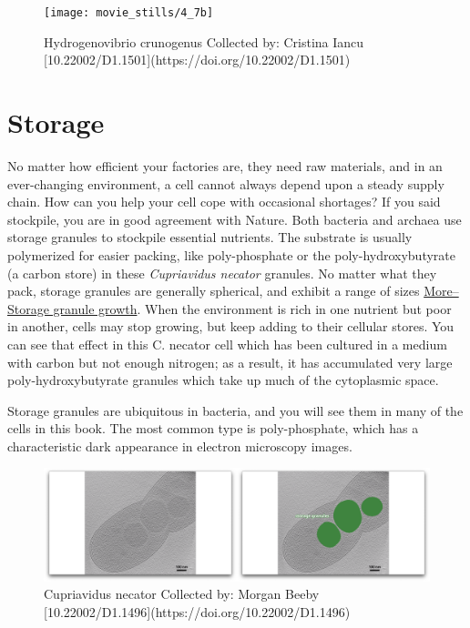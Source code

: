 \documentclass[]{tufte-book}
\begin{document}
\begin{figure}
\texttt{[image: movie\_stills/4\_7b]} \caption[Hydrogenovibrio crunogenus Collected by]{Hydrogenovibrio crunogenus Collected by: Cristina Iancu [10.22002/D1.1501](https://doi.org/10.22002/D1.1501)}\label{fig:unnamed-chunk-71}
\end{figure}

\section{Storage}\label{storage}

No matter how efficient your factories are, they need raw materials, and
in an ever-changing environment, a cell cannot always depend upon a
steady supply chain. How can you help your cell cope with occasional
shortages? If you said stockpile, you are in good agreement with Nature.
Both bacteria and archaea use storage granules to stockpile essential
nutrients. The substrate is usually polymerized for easier packing, like
poly-phosphate or the poly-hydroxybutyrate (a carbon store) in these
\emph{Cupriavidus necator} granules. No matter what they pack, storage
granules are generally spherical, and exhibit a range of sizes
\protect\hyperlink{morestorage-granule-growth}{More--Storage granule
growth}. When the environment is rich in one nutrient but poor in
another, cells may stop growing, but keep adding to their cellular
stores. You can see that effect in this C. necator cell which has been
cultured in a medium with carbon but not enough nitrogen; as a result,
it has accumulated very large poly-hydroxybutyrate granules which take
up much of the cytoplasmic space.

Storage granules are ubiquitous in bacteria, and you will see them in
many of the cells in this book. The most common type is poly-phosphate,
which has a characteristic dark appearance in electron microscopy
images.

\begin{figure}
\includegraphics{movie_stills/4_8} \caption[Cupriavidus necator Collected by]{Cupriavidus necator Collected by: Morgan Beeby [10.22002/D1.1496](https://doi.org/10.22002/D1.1496)}\label{fig:unnamed-chunk-72}
\end{figure}
\end{document}
